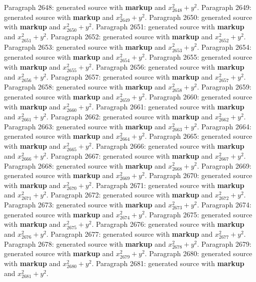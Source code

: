 \documentclass{article}
\begin{document}
Paragraph 2648: generated source with \textbf{markup} and $x_{2648}^2 + y^2$.
Paragraph 2649: generated source with \textbf{markup} and $x_{2649}^2 + y^2$.
Paragraph 2650: generated source with \textbf{markup} and $x_{2650}^2 + y^2$.
Paragraph 2651: generated source with \textbf{markup} and $x_{2651}^2 + y^2$.
Paragraph 2652: generated source with \textbf{markup} and $x_{2652}^2 + y^2$.
Paragraph 2653: generated source with \textbf{markup} and $x_{2653}^2 + y^2$.
Paragraph 2654: generated source with \textbf{markup} and $x_{2654}^2 + y^2$.
Paragraph 2655: generated source with \textbf{markup} and $x_{2655}^2 + y^2$.
Paragraph 2656: generated source with \textbf{markup} and $x_{2656}^2 + y^2$.
Paragraph 2657: generated source with \textbf{markup} and $x_{2657}^2 + y^2$.
Paragraph 2658: generated source with \textbf{markup} and $x_{2658}^2 + y^2$.
Paragraph 2659: generated source with \textbf{markup} and $x_{2659}^2 + y^2$.
Paragraph 2660: generated source with \textbf{markup} and $x_{2660}^2 + y^2$.
Paragraph 2661: generated source with \textbf{markup} and $x_{2661}^2 + y^2$.
Paragraph 2662: generated source with \textbf{markup} and $x_{2662}^2 + y^2$.
Paragraph 2663: generated source with \textbf{markup} and $x_{2663}^2 + y^2$.
Paragraph 2664: generated source with \textbf{markup} and $x_{2664}^2 + y^2$.
Paragraph 2665: generated source with \textbf{markup} and $x_{2665}^2 + y^2$.
Paragraph 2666: generated source with \textbf{markup} and $x_{2666}^2 + y^2$.
Paragraph 2667: generated source with \textbf{markup} and $x_{2667}^2 + y^2$.
Paragraph 2668: generated source with \textbf{markup} and $x_{2668}^2 + y^2$.
Paragraph 2669: generated source with \textbf{markup} and $x_{2669}^2 + y^2$.
Paragraph 2670: generated source with \textbf{markup} and $x_{2670}^2 + y^2$.
Paragraph 2671: generated source with \textbf{markup} and $x_{2671}^2 + y^2$.
Paragraph 2672: generated source with \textbf{markup} and $x_{2672}^2 + y^2$.
Paragraph 2673: generated source with \textbf{markup} and $x_{2673}^2 + y^2$.
Paragraph 2674: generated source with \textbf{markup} and $x_{2674}^2 + y^2$.
Paragraph 2675: generated source with \textbf{markup} and $x_{2675}^2 + y^2$.
Paragraph 2676: generated source with \textbf{markup} and $x_{2676}^2 + y^2$.
Paragraph 2677: generated source with \textbf{markup} and $x_{2677}^2 + y^2$.
Paragraph 2678: generated source with \textbf{markup} and $x_{2678}^2 + y^2$.
Paragraph 2679: generated source with \textbf{markup} and $x_{2679}^2 + y^2$.
Paragraph 2680: generated source with \textbf{markup} and $x_{2680}^2 + y^2$.
Paragraph 2681: generated source with \textbf{markup} and $x_{2681}^2 + y^2$.
\end{document}
